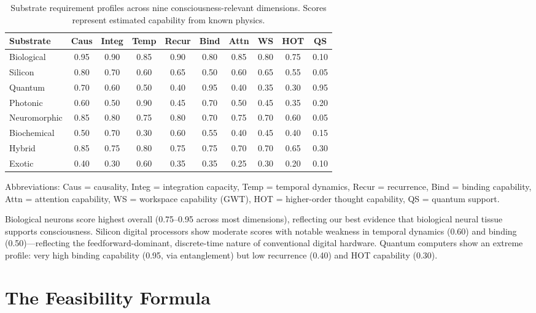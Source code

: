 \documentclass[12pt]{book}
\begin{document}
\begin{table}[H]
\centering
\caption{Substrate requirement profiles across nine consciousness-relevant dimensions. Scores represent estimated capability from known physics.}
\label{tab:substrate-dims}
\begin{tabular}{l@{\hskip 4pt}c@{\hskip 4pt}c@{\hskip 4pt}c@{\hskip 4pt}c@{\hskip 4pt}c@{\hskip 4pt}c@{\hskip 4pt}c@{\hskip 4pt}c@{\hskip 4pt}c}
\toprule
\textbf{Substrate} & \textbf{Caus} & \textbf{Integ} & \textbf{Temp} & \textbf{Recur} & \textbf{Bind} & \textbf{Attn} & \textbf{WS} & \textbf{HOT} & \textbf{QS} \\
\midrule
Biological & 0.95 & 0.90 & 0.85 & 0.90 & 0.80 & 0.85 & 0.80 & 0.75 & 0.10 \\
Silicon & 0.80 & 0.70 & 0.60 & 0.65 & 0.50 & 0.60 & 0.65 & 0.55 & 0.05 \\
Quantum & 0.70 & 0.60 & 0.50 & 0.40 & 0.95 & 0.40 & 0.35 & 0.30 & 0.95 \\
Photonic & 0.60 & 0.50 & 0.90 & 0.45 & 0.70 & 0.50 & 0.45 & 0.35 & 0.20 \\
Neuromorphic & 0.85 & 0.80 & 0.75 & 0.80 & 0.70 & 0.75 & 0.70 & 0.60 & 0.05 \\
Biochemical & 0.50 & 0.70 & 0.30 & 0.60 & 0.55 & 0.40 & 0.45 & 0.40 & 0.15 \\
Hybrid & 0.85 & 0.75 & 0.80 & 0.75 & 0.75 & 0.70 & 0.70 & 0.65 & 0.30 \\
Exotic & 0.40 & 0.30 & 0.60 & 0.35 & 0.35 & 0.25 & 0.30 & 0.20 & 0.10 \\
\bottomrule
\end{tabular}
\end{table}

Abbreviations: Caus = causality, Integ = integration capacity, Temp = temporal dynamics, Recur = recurrence, Bind = binding capability, Attn = attention capability, WS = workspace capability (GWT), HOT = higher-order thought capability, QS = quantum support.

Biological neurons score highest overall (0.75--0.95 across most dimensions), reflecting our best evidence that biological neural tissue supports consciousness. Silicon digital processors show moderate scores with notable weakness in temporal dynamics (0.60) and binding (0.50)---reflecting the feedforward-dominant, discrete-time nature of conventional digital hardware. Quantum computers show an extreme profile: very high binding capability (0.95, via entanglement) but low recurrence (0.40) and HOT capability (0.30).

\section{The Feasibility Formula}
\end{document}
